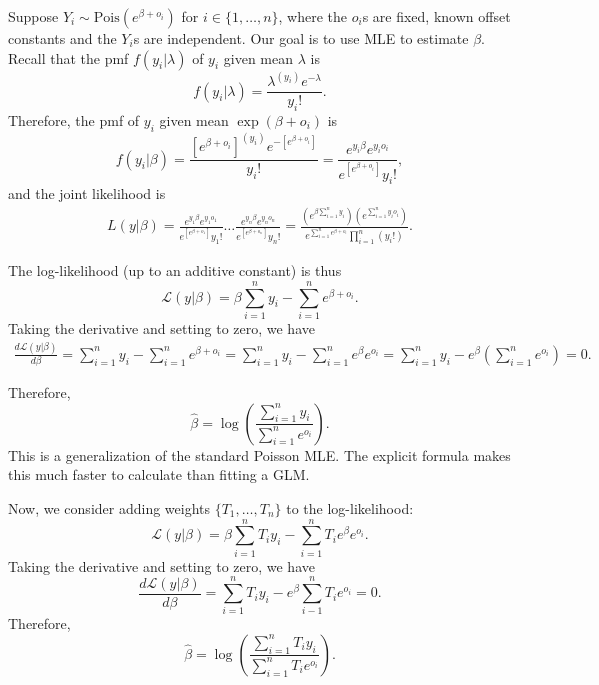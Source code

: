 \documentclass[12pt]{article}
\begin{document}
Suppose $Y_i \sim \textrm{Pois}( e^{ \beta + o_i } )$ for $i \in \{1, \dots, n\}$, where the $o_i$s are fixed, known offset constants and the $Y_i$s are independent. Our goal is to use MLE to estimate $\beta$. Recall that the pmf $f(y_i | \lambda)$ of $y_i$ given mean $\lambda$ is
$$ f(y_i | \lambda) =  \frac{ \lambda^{(y_i)} e^{-\lambda} }{ y_i!}.$$ Therefore, the pmf of $y_i$ given mean $ \exp\left( \beta + o_i \right) $ is 
$$ f(y_i | \beta) = \frac{\left[ e^{\beta + o_i}  \right]^{(y_i)} e ^{ - \left[ e^{\beta + o_i}  \right] }}{ y_i! } = \frac{ e^{y_i\beta} e^{y_i o_i}   }{ e^{\left[ e^{\beta + o_i} \right]} y_i! },$$ and the joint likelihood is
\begin{multline*}
 L( y | \beta ) = \frac{ e^{ y_1 \beta } e^{ y_1 o_1}}{ e^{ \left[ e^{ \beta + o_1 } \right] } y_1! } \dots \frac{ e^{ y_n \beta } e^{ y_n o_n}}{ e^{ \left[ e^{ \beta + o_n } \right] } y_n! }  = \frac{ \left( e^{ \beta \sum_{i=1}^n y_i} \right) \left(e^{ \sum_{i=1}^n y_io_i} \right)}{ e^{ \sum_{i=1}^n e^{\beta + o_i}}  \prod_{i=1}^n \left( y_i! \right) }.
\end{multline*}

The log-likelihood (up to an additive constant) is thus
$$ \mathcal{L}(y | \beta) = \beta \sum_{i=1}^n y_i -\sum_{i=1}^n e^{\beta + o_i}.$$
Taking the derivative and setting to zero, we have
\begin{multline*} \frac{  d \mathcal{L}(y | \beta) }{ d \beta} = \sum_{i=1}^n y _i - \sum_{i=1}^n e^{\beta + o_i} =\sum_{i=1}^n y_i - \sum_{i=1}^n e^\beta e^{o_i} = \sum_{i = 1}^n y_i - e^\beta \left( \sum_{i=1}^n e^{o_i}  \right) = 0.
\end{multline*}

Therefore,
$$ \hat{\beta} = \log \left( \frac{ \sum_{i=1}^n y_i }{ \sum_{i=1}^n e^{o_i} } \right).$$ This is a generalization of the standard Poisson MLE. The explicit formula makes this much faster to calculate than fitting a GLM.

Now, we consider adding weights $\{T_1, \dots, T_n \}$ to the log-likelihood:
$$ \mathcal{L}(y|\beta) = \beta \sum_{i=1}^n T_i y_i - \sum_{i=1}^n T_i e^{\beta}e^{o_i} .$$ Taking the derivative and setting to zero, we have
$$ \frac{ d \mathcal{L}(y|\beta) }{ d\beta} = \sum_{i=1}^n T_i y_i - e^\beta \sum_{i-1}^n T_i e^{o_i} = 0.$$ Therefore,
$$ \hat{\beta} = \log\left( \frac{ \sum_{i=1}^n T_i y_i }{ \sum_{i=1}^n T_i e^{o_i}} \right).$$
\end{document}
